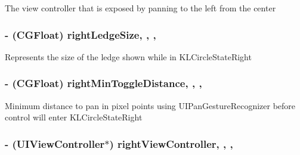 The view controller that is exposed by panning to the left from the center \hypertarget{interface_k_l_circle_view_controller_aa373705476fa68a853df552c0d6564a1}{
\subsubsection[{right\-Ledge\-Size}]{\setlength{\rightskip}{0pt plus 5cm}-\/ (C\-G\-Float) right\-Ledge\-Size\hspace{0.3cm}{\ttfamily [read]}, {\ttfamily [write]}, {\ttfamily [nonatomic]}, {\ttfamily [assign]}}}\label{interface_k_l_circle_view_controller_aa373705476fa68a853df552c0d6564a1}
Represents the size of the ledge shown while in K\-L\-Circle\-State\-Right \hypertarget{interface_k_l_circle_view_controller_a5dcc2ddeefd5abf04b651d269d9bd2aa}{
\subsubsection[{right\-Min\-Toggle\-Distance}]{\setlength{\rightskip}{0pt plus 5cm}-\/ (C\-G\-Float) right\-Min\-Toggle\-Distance\hspace{0.3cm}{\ttfamily [read]}, {\ttfamily [write]}, {\ttfamily [nonatomic]}, {\ttfamily [assign]}}}\label{interface_k_l_circle_view_controller_a5dcc2ddeefd5abf04b651d269d9bd2aa}
Minimum distance to pan in pixel points using U\-I\-Pan\-Gesture\-Recognizer before control will enter K\-L\-Circle\-State\-Right \hypertarget{interface_k_l_circle_view_controller_a2dbd44e3d1f0ab5e262cfae8f9a22044}{
\subsubsection[{right\-View\-Controller}]{\setlength{\rightskip}{0pt plus 5cm}-\/ (U\-I\-View\-Controller$\ast$) right\-View\-Controller\hspace{0.3cm}{\ttfamily [read]}, {\ttfamily [write]}, {\ttfamily [nonatomic]}, {\ttfamily [strong]}}}\label{interface_k_l_circle_view_controller_a2dbd44e3d1f0ab5e262cfae8f9a22044}
